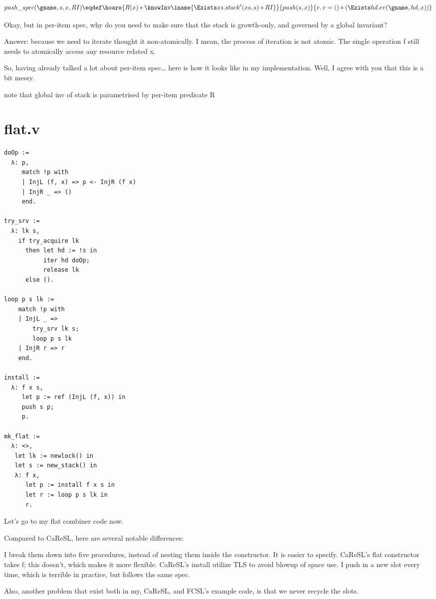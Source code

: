 \documentclass[11pt]{article}
\begin{document}
\[push\_spec (\gname, s, x, RI) \eqdef
  \hoare{R(x) * \knowInv\iname{\Exists xs. stack'(xs, s) * RI}}{push(s, x)}{v.\, v = () * (\Exists hd. ev(\gname, hd, x))}\]

Okay, but in per-item spec, why do you need to make sure that the stack is growth-only, and governed by a global invariant?

Answer: because we need to iterate thought it non-atomically. I mean, the process of iteration is not atomic. The single operation f still needs to atomically access any resource related x.

So, having already talked a lot about per-item spec… here is how it looks like in my implementation. Well, I agree with you that this is a bit messy. 

note that global inv of stack is parametrised by per-item predicate R

\section{flat.v}

\begin{verbatim}
doOp :=
  λ: p,
     match !p with
     | InjL (f, x) => p <- InjR (f x)
     | InjR _ => ()
     end.

try_srv :=
  λ: lk s,
    if try_acquire lk
      then let hd := !s in
           iter hd doOp;
           release lk
      else ().

loop p s lk :=
    match !p with
    | InjL _ =>
        try_srv lk s;
        loop p s lk
    | InjR r => r
    end.

install :=
  λ: f x s,
     let p := ref (InjL (f, x)) in
     push s p;
     p.

mk_flat :=
  λ: <>,
   let lk := newlock() in
   let s := new_stack() in
   λ: f x,
      let p := install f x s in
      let r := loop p s lk in
      r.
\end{verbatim}


Let’s go to my flat combiner code now.

Compared to CaReSL, here are several notable differences:

I break them down into five procedures, instead of nesting them inside the constructor. It is easier to specify.
CaReSL’s flat constructor takes f; this doesn’t, which makes it more flexible.
CaReSL’s install utilize TLS to avoid blowup of space use. I push in a new slot every time, which is terrible in practice, but follows the same spec.

Also, another problem that exist both in my, CaReSL, and FCSL’s example code, is that we never recycle the slots.
\end{document}
